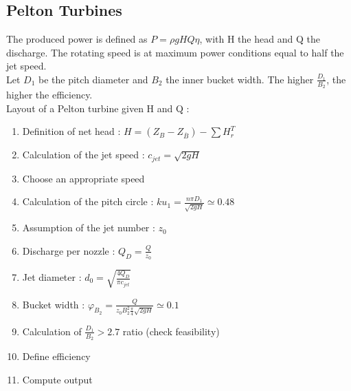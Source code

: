 \documentclass[../main.tex]{subfiles}
\begin{document}
\subsection{Pelton Turbines}
The produced power is defined as $P = \rho g H Q \eta$, with H the head and Q the discharge. The rotating speed is at maximum power conditions equal to half the jet speed.\\
Let $D_1$ be the pitch diameter and $B_2$ the inner bucket width. The higher $\frac{D_1}{B_2}$, the higher the efficiency.\\
Layout of a Pelton turbine given H and Q : \begin{enumerate}
    \item Definition of net head : $H = (Z_B - Z_{\overline{B}}) - \sum H_r^T$
    \item Calculation of the jet speed : $c_{jet} = \sqrt{2gH}$
    \item Choose an appropriate speed
    \item Calculation of the pitch circle : $ku_1 = \frac{n\pi D_1}{\sqrt{2gH}} \simeq 0.48$
    \item Assumption of the jet number : $z_0$
    \item Discharge per nozzle : $Q_D = \frac{Q}{z_0}$
    \item Jet diameter : $d_0 = \sqrt{\frac{4Q_D}{\pi c_{jet}}}$
    \item Bucket width : $\varphi_{B_2} = \frac{Q}{z_0 B_2^2 \frac{\pi}{4} \sqrt{2gH}} \simeq 0.1$
    \item Calculation of $\frac{D_1}{B_2}>2.7$ ratio (check feasibility)
    \item Define efficiency
    \item Compute output
\end{enumerate}
\end{document}

